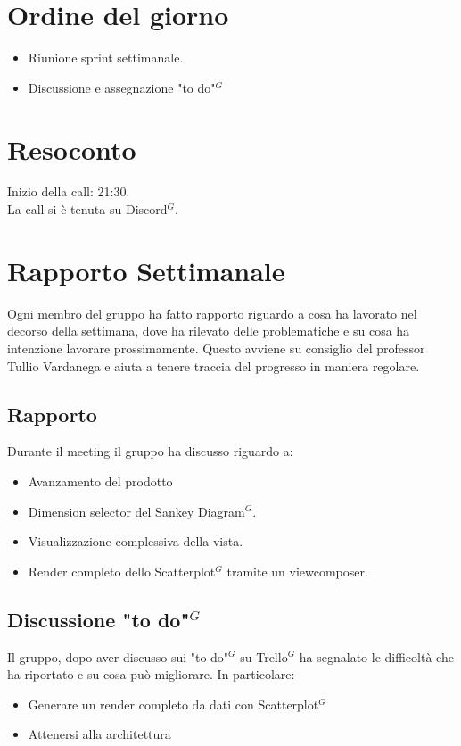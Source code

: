 \section{Ordine del giorno}

\begin{itemize}
	\item Riunione sprint settimanale.
    \item Discussione e assegnazione "to do"$^{G}$ 
\end{itemize}

\section{Resoconto}

\noindent
Inizio della call: 21:30. \\
\noindent La call si è tenuta su Discord$^{G}$.
\section{Rapporto Settimanale}
Ogni membro del gruppo ha fatto rapporto riguardo a cosa ha lavorato nel decorso della settimana, dove ha rilevato delle problematiche e su cosa ha intenzione lavorare prossimamente.
Questo avviene su consiglio del professor Tullio Vardanega e aiuta a tenere traccia del progresso in maniera regolare.

\subsection{Rapporto}
Durante il meeting il gruppo ha discusso riguardo a:
\begin{itemize}
	\item Avanzamento del prodotto 
	\item Dimension selector del Sankey Diagram$^{G}$.
    \item Visualizzazione complessiva della vista.
    \item Render completo dello Scatterplot$^{G}$ tramite un viewcomposer.
\end{itemize}

\subsection{Discussione "to do"$^{G}$}
Il gruppo, dopo aver discusso sui "to do"$^{G}$ su Trello$^{G}$ ha segnalato le difficoltà che ha riportato e su cosa può migliorare. In particolare:
\begin{itemize}
	\item Generare un render completo da dati con Scatterplot$^{G}$
	\item Attenersi alla architettura
\end{itemize}

